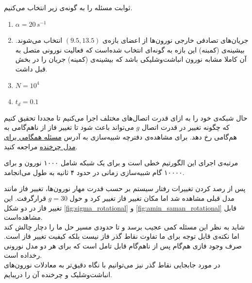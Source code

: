 ثوابت مسئله را به گونه‌ی زیر انتخاب می‌کنیم.
\begin{tcolorbox}[colback=green!5!white,colframe=green!75!black]
	\begin{enumerate}[*]
		\item
		$\alpha = 20\, s^{-1}$
		\item
		جریان‌های تصادفی خارجی نورون‌ها از اعضای بازه‌ی $(9.5,13.5)$ انتخاب می‌شوند. بیشینه‌ی (کمبنه) این بازه به گونه‌ای انتخاب شده‌است که فعالیت نورونی متصل به آن‌ کاملا مشابه نورون انباشت‌وشلیکی باشد که بیشینه‌ی (کمینه) جریان را در بخش قبل داشت. 
		\item
		$N = 10^4$
		\item
		$t_d = 0.1$ 
	\end{enumerate}
\end{tcolorbox}
حال شبکه‌ی خود را به ازای قدرت اتصال‌های مختلف اجرا می‌کنیم تا مجددا تحقیق کنیم که چگونه تغییر در قدرت اتصال $g$ می‌تواند باعث شود تا تغییر فاز از ناهم‌گامی به هم‌گامی رخ دهد. برای مشاهده‌ی دفترچه شبیه‌سازی به آدرس 
\href{run://..//scripts//rotational_model}{مسئله همگامی برای مدل چرخنده}
مراجعه کنید.

مرتبه‌ی اجرای این الگورتیم خطی است و برای یک شبکه شامل ۱۰۰۰ نورون و برای ۱۰۰۰۰ گام شبیه‌سازی زمانی در حدود ۴ ثانیه به طول می‌انجامد. 


پس از رصد کردن تغییرات رفتار سیستم بر حسب قدرت مهار نورون‌ها، تغییر فاز مانند مدل قبلی مشاهده شد اما مکان تغییر فاز تغییر کرد و حول $g=30$ قرارگرفت. این تغییر فاز در دو شکل \ref{fig:sigma_rotational} و \ref{fig:amin_saman_rotational}  قابل مشاهده‌است.\\
شاید به نظر این مسئله کمی عجیب برسد و تا حدودی مسیر حل ما را دچار چالش کند اما نکته‌ی قابل توجه برای ما تفاوت نقاط گذر فاز نیست بلکه کیفیت تغییر فاز است. صرف وجود فازی هم‌گام پس از نا‌هم‌گام قابل تامل است که برای هر دو مدل نورونی رخداده است.\\
در مورد جابجایی نقاط گذر نیز می‌توانیم با نگاه دقیق‌تر به معادلات نورون‌های انباشت‌وشلیک و چرخنده آن را دریبایم.\\

